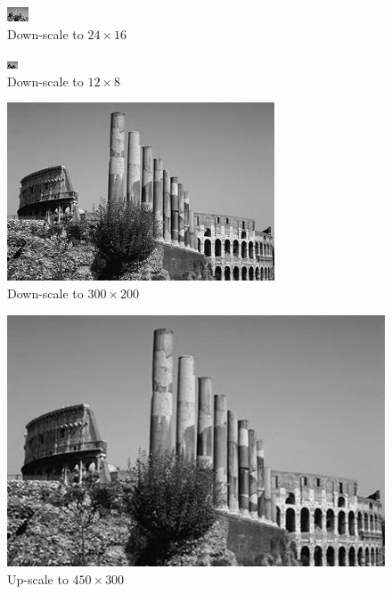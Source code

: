 \documentclass{article}
\begin{document}
\begin{figure}[H]
\centering
\includegraphics[width=18pt]{../result/scale-24-16.png}
\caption{Down-scale to $24 \times 16$}
\label{scale24}
\end{figure}

\begin{figure}[H]
\centering
\includegraphics[width=9pt]{../result/scale-12-8.png}
\caption{Down-scale to $12 \times 8$}
\label{scale12}
\end{figure}

\begin{figure}[H]
\centering
\includegraphics[width=225pt]{../result/scale-300-200.png}
\caption{Down-scale to $300 \times 200$}
\label{scale300}
\end{figure}

\begin{figure}[H]
\centering
\includegraphics[width=337.5pt]{../result/scale-450-300.png}
\caption{Up-scale to $450 \times 300$}
\label{scale450}
\end{figure}
\end{document}

